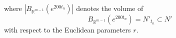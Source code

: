 \documentclass[10pt,reqno]{amsart}
\theoremstyle{Theorem}
\theoremstyle{definition}
\theoremstyle{remark}
\newcommand{\note}[1]{\marginpar{{\color{red}\footnotesize \begin{spacing}{1}#1\end{spacing}}}}
\newcommand{\td}{\tilde}
\newcommand{\R}{\mathbb {R}}
\renewcommand\P{\mathbb{P}}
\def\red{\color{red}}
\def\blue{}
\begin{document}

 \noindent where $|B_{\R^{m-1}}(e^{200t_n})|$ denotes the volume of $$B_{\R^{m-1}}(e^{200t_n})= N'_{t_n} \subset  N'$$ with respect to the Euclidean parameters $r$.




%
%





\end{document}
